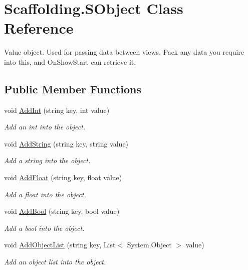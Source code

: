 \hypertarget{class_scaffolding_1_1_s_object}{\section{Scaffolding.\+S\+Object Class Reference}
\label{class_scaffolding_1_1_s_object}
}


Value object. Used for passing data between views. Pack any data you require into this, and On\+Show\+Start can retrieve it.  


\subsection*{Public Member Functions}
\begin{DoxyCompactItemize}
\item 
void \hyperlink{class_scaffolding_1_1_s_object_a85026a282f20ae9319fcbbc8894a0cf0}{Add\+Int} (string key, int value)
\begin{DoxyCompactList}\small\item\em Add an int into the object. \end{DoxyCompactList}\item 
void \hyperlink{class_scaffolding_1_1_s_object_aa6d9e75007547ef7feb0047ae6458edb}{Add\+String} (string key, string value)
\begin{DoxyCompactList}\small\item\em Add a string into the object. \end{DoxyCompactList}\item 
void \hyperlink{class_scaffolding_1_1_s_object_aabbaa83927a45116a89103ddac5d3242}{Add\+Float} (string key, float value)
\begin{DoxyCompactList}\small\item\em Add a float into the object. \end{DoxyCompactList}\item 
void \hyperlink{class_scaffolding_1_1_s_object_a6a595710bc12e94c5c5c696bb0b98b85}{Add\+Bool} (string key, bool value)
\begin{DoxyCompactList}\small\item\em Add a bool into the object. \end{DoxyCompactList}\item 
void \hyperlink{class_scaffolding_1_1_s_object_a3fea64b340f46919191c1bc8acefa0ad}{Add\+Object\+List} (string key, List$<$ System.\+Object $>$ value)
\begin{DoxyCompactList}\small\item\em Add an object list into the object. \end{DoxyCompactList}\item 

\end{DoxyCompactItemize}
